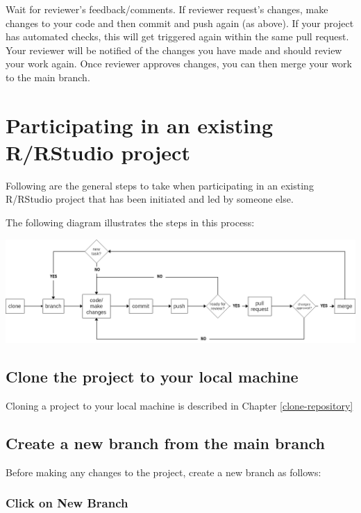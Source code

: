 \documentclass[
  12pt,
]{book}
\begin{document}
Wait for reviewer's feedback/comments. If reviewer request's changes, make changes to your code and then commit and push again (as above). If your project has automated checks, this will get triggered again within the same pull request. Your reviewer will be notified of the changes you have made and should review your work again. Once reviewer approves changes, you can then merge your work to the main branch.

\hypertarget{participate-projects}{%
\chapter{Participating in an existing R/RStudio project}\label{participate-projects}}

Following are the general steps to take when participating in an existing R/RStudio project that has been initiated and led by someone else.

The following diagram illustrates the steps in this process:

\includegraphics{images/git_process1.png}

\hypertarget{clone-the-project-to-your-local-machine}{%
\section{Clone the project to your local machine}\label{clone-the-project-to-your-local-machine}}

Cloning a project to your local machine is described in Chapter \ref{clone-repository}

\hypertarget{create-a-new-branch-from-the-main-branch}{%
\section{Create a new branch from the main branch}\label{create-a-new-branch-from-the-main-branch}}

Before making any changes to the project, create a new branch as follows:

\hypertarget{click-on-new-branch}{%
\subsection{\texorpdfstring{Click on \textbf{New Branch}}{Click on New Branch}}\label{click-on-new-branch}}
\end{document}
